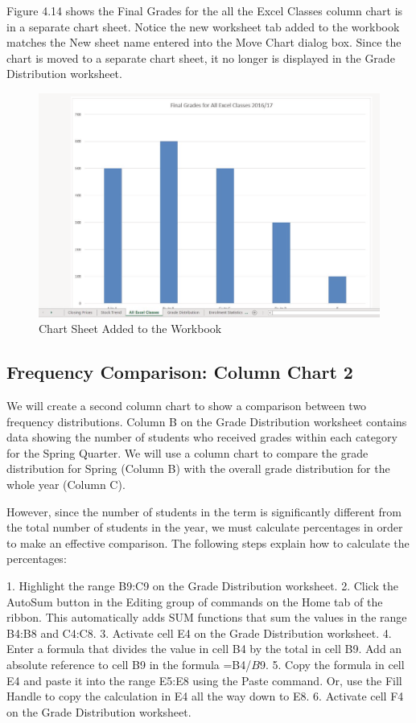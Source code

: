 Figure 4.14 shows the Final Grades for the all the Excel Classes column chart is in a separate chart
sheet. Notice the new worksheet tab added to the workbook matches the New sheet name entered
into the Move Chart dialog box. Since the chart is moved to a separate chart sheet, it no longer is
displayed in the Grade Distribution worksheet.


\begin{figure}[H]
	\centering
	\includegraphics[width=\maxwidth{.95\linewidth}]{gfx/ch04_fig15}
	\caption{Chart Sheet Added to the Workbook}
	\label{04:fig15}
\end{figure}






\subsection{Frequency Comparison: Column Chart 2}

We will create a second column chart to show a comparison between two frequency distributions.
Column B on the Grade Distribution worksheet contains data showing the number of students who
received grades within each category for the Spring Quarter. We will use a column chart to compare
the grade distribution for Spring (Column B) with the overall grade distribution for the whole year
(Column C).

However, since the number of students in the term is significantly different from the total number
of students in the year, we must calculate percentages in order to make an effective comparison. The
following steps explain how to calculate the percentages:

1. Highlight the range B9:C9 on the Grade Distribution worksheet.
2. Click the AutoSum button in the Editing group of commands on the Home tab of the ribbon.
This automatically adds SUM functions that sum the values in the range B4:B8 and C4:C8.
3. Activate cell E4 on the Grade Distribution worksheet.
4. Enter a formula that divides the value in cell B4 by the total in cell B9. Add an absolute reference
to cell B9 in the formula =B4/$B$9.
5. Copy the formula in cell E4 and paste it into the range E5:E8 using the Paste command.
Or, use the Fill Handle to copy the calculation in E4 all the way down to E8.
6. Activate cell F4 on the Grade Distribution worksheet.


